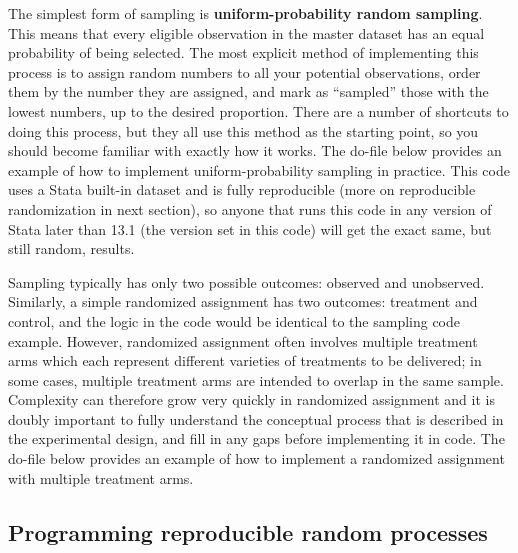 The simplest form of sampling is 
\textbf{uniform-probability random sampling}.
This means that every eligible observation in the master dataset
has an equal probability of being selected.
The most explicit method of implementing this process
is to assign random numbers to all your potential observations,
order them by the number they are assigned,
and mark as ``sampled'' those with the lowest numbers, up to the desired proportion.
There are a number of shortcuts to doing this process,
but they all use this method as the starting point,
so you should become familiar with exactly how it works.
The do-file below provides an example of
how to implement uniform-probability sampling in practice.
This code uses a Stata built-in dataset and is fully reproducible
(more on reproducible randomization in next section),
so anyone that runs this code in any version of Stata later than 13.1
(the version set in this code)
will get the exact same, but still random, results.


Sampling typically has only two possible outcomes: observed and unobserved.
Similarly, a simple randomized assignment has two outcomes: treatment and control,
and the logic in the code would be identical to the sampling code example.
However, randomized assignment often involves multiple treatment arms
which each represent different varieties of treatments to be delivered;
in some cases, multiple treatment arms are intended to overlap in the same sample.
Complexity can therefore grow very quickly in randomized assignment
and it is doubly important to fully understand the conceptual process
that is described in the experimental design,
and fill in any gaps before implementing it in code.
The do-file below provides an example of how to implement
a randomized assignment with multiple treatment arms.



\subsection{Programming reproducible random processes}


